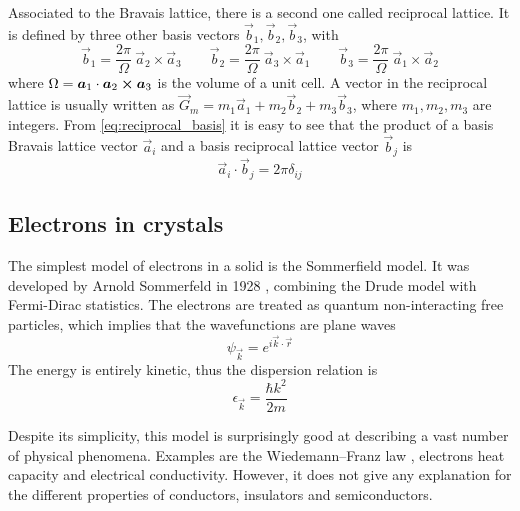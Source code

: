 Associated to the Bravais lattice, there is a second one called reciprocal lattice. It is defined by three other basis vectors $\vec{b}_1, \vec{b}_2, \vec{b}_3$, with
\begin{equation} \label{eq:reciprocal_basis}
    \vec{b}_1 = \frac{2\pi}{\Omega} \ \vec{a}_2 \times \vec{a}_3
    \qquad
    \vec{b}_2 = \frac{2\pi}{\Omega} \ \vec{a}_3 \times \vec{a}_1
    \qquad
    \vec{b}_3 = \frac{2\pi}{\Omega} \ \vec{a}_1 \times \vec{a}_2
\end{equation}
where $\Omega = \mathbf{\boldsymbol{a}}_1 \cdot \mathbf{\boldsymbol{a}}_2 \cross \mathbf{\boldsymbol{a}}_3$ is the volume of a unit cell. A vector in the reciprocal lattice is usually written as $\vec{G}_m = m_1\vec{a}_1 + m_2\vec{b}_2 + m_3\vec{b}_3$, where $m_1, m_2, m_3$ are integers. From \cref{eq:reciprocal_basis} it is easy to see that the product of a basis Bravais lattice vector $\vec{a}_i$ and a basis reciprocal lattice vector $\vec{b}_j$ is
\begin{equation}
    \vec{a}_i \cdot \vec{b}_j = 2\pi \delta_{ij}
\end{equation}

\subsection{Electrons in crystals} \label{sec:electrons}
The simplest model of electrons in a solid is the Sommerfield model. It was developed by Arnold Sommerfeld in 1928 \cite{sommerfeldZurElektronentheorieMetalle1928}, combining the Drude model \cite{drude1900a} with Fermi-Dirac statistics. The electrons are treated as quantum non-interacting free particles, which implies that the wavefunctions are plane waves
\begin{equation} \label{eq:plane_wave}
    \psi_\vec{k} = e^{i\vec{k}\cdot\vec{r}}
\end{equation}
The energy is entirely kinetic, thus the dispersion relation is
\begin{equation} \label{eq:free_dispersion}
    \epsilon_\vec{k} = \frac{\hbar k^2}{2m}
\end{equation}

Despite its simplicity, this model is surprisingly good at describing a vast number of physical phenomena. Examples are the Wiedemann–Franz law \cite{jones1985}, electrons heat capacity and electrical conductivity. However, it does not give any explanation for the different properties of conductors, insulators and semiconductors.

